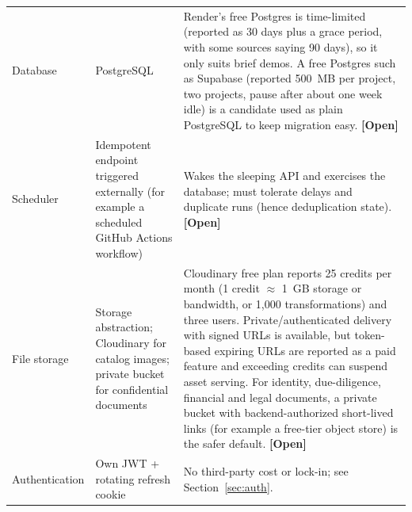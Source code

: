 \documentclass[11pt,a4paper]{article}
\newcommand{\code}[1]{\texttt{\detokenize{#1}}}
\newcommand{\tagopen}{\textcolor{red!70!black}{\textbf{[Open]}}}
\begin{document}
\begin{longtable}{@{}L{2.4cm}L{3.6cm}L{9.8cm}@{}}
	Database           & PostgreSQL                                                                                             & Render's free Postgres is time-limited (reported as 30 days plus a grace period, with some sources saying 90 days), so it only suits brief demos. A free Postgres such as Supabase (reported 500~MB per project, two projects, pause after about one week idle) is a candidate used as plain PostgreSQL to keep migration easy. \tagopen{}                                                                                                                                                                             \\
	Scheduler          & Idempotent \code{tick} endpoint triggered externally (for example a scheduled GitHub Actions workflow) & Wakes the sleeping API and exercises the database; must tolerate delays and duplicate runs (hence deduplication state). \tagopen{}                                                                                                                                                                                                                                                                                                                                                                                     \\
	File storage       & Storage abstraction; Cloudinary for catalog images; private bucket for confidential documents          & Cloudinary free plan reports 25 credits per month (1 credit $\approx$ 1~GB storage or bandwidth, or 1,000 transformations) and three users. Private/authenticated delivery with signed URLs is available, but token-based expiring URLs are reported as a paid feature and exceeding credits can suspend asset serving. For identity, due-diligence, financial and legal documents, a private bucket with backend-authorized short-lived links (for example a free-tier object store) is the safer default. \tagopen{} \\
	Authentication     & Own JWT + rotating refresh cookie                                                                      & No third-party cost or lock-in; see Section~\ref{sec:auth}.                                                                                                                                                                                                                                                                                                                                                                                                                                                            \\

\end{longtable}
\end{document}
